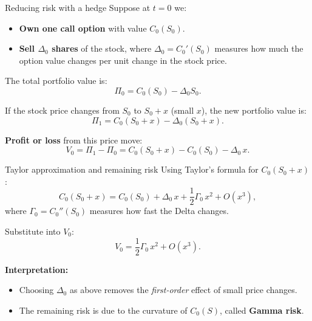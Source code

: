 \documentclass[11pt,aspectratio=169]{beamer}
\begin{document}
\begin{frame}{Reducing risk with a hedge}
\small
Suppose at $t=0$ we:
\begin{itemize}
\item \textbf{Own one call option} with value $C_0(S_0)$.
\item \textbf{Sell $\Delta_0$ shares} of the stock, where 
$\Delta_0 = C_0'(S_0)$ measures how much the option value changes per unit change in the stock price.
\end{itemize}

The total portfolio value is:
\[
\Pi_0 = C_0(S_0) - \Delta_0 S_0.
\]

\medskip
If the stock price changes from $S_0$ to $S_0 + x$ (small $x$), the new portfolio value is:
\[
\Pi_1 = C_0(S_0 + x) - \Delta_0 (S_0 + x).
\]

\medskip
\textbf{Profit or loss} from this price move:
\[
V_0 = \Pi_1 - \Pi_0 = C_0(S_0+x) - C_0(S_0) - \Delta_0\,x.
\]
\end{frame}

\begin{frame}{Taylor approximation and remaining risk}
\small
Using Taylor's formula for $C_0(S_0+x)$:
\[
C_0(S_0+x) = C_0(S_0) + \Delta_0\,x + \frac12 \Gamma_0\,x^2 + O(x^3),
\]
where $\Gamma_0 = C_0''(S_0)$ measures how fast the Delta changes.

\medskip
Substitute into $V_0$:
\[
V_0 = \frac12 \Gamma_0\,x^2 + O(x^3).
\]

\textbf{Interpretation:}
\begin{itemize}
\item Choosing $\Delta_0$ as above removes the \emph{first-order} effect of small price changes.
\item The remaining risk is due to the curvature of $C_0(S)$, called \textbf{Gamma risk}.
\end{itemize}
%
\end{frame}
\end{document}
